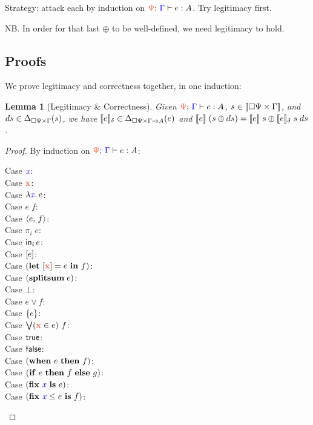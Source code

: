 \documentclass{article}
\theoremstyle{plain}
\newtheorem{lemma}{Lemma}
\theoremstyle{definition}
\begin{document}
Strategy: attack each by induction on $\J{\GP}{\GG}{e}{A}$. Try legitimacy
first.

NB. In order for that last $\oplus$ to be well-defined, we need legitimacy to
hold.


\subsection{Proofs}

We prove legitimacy and correctness together, in one induction:

\begin{lemma}[Legitimacy \& Correctness]
  Given $\J{\GP}{\GG}{e}{A}$, $s \in {\llbracket{\square{\Psi} \times\Gamma}\rrbracket}$, and $ds \in
  \Delta_{\square{\Psi} \times \Gamma}({s})$, we have $\llbracket{e}\rrbracket_\delta \in \Delta_{\square{\Psi} \times
    \Gamma \to A}({e})$ and $\llbracket{e}\rrbracket \;(s \oplus ds) = \llbracket{e}\rrbracket\;s \oplus
  \llbracket{e}\rrbracket_\delta\;s\;ds$.
\end{lemma}

\begin{proof}
  By induction on $\J{\GP}{\GG}{e}{A}$:

  \begin{description}
    \item[Case $\mathit{{\color{blue}{x}}}$:]
    \item[Case $\d x$:]
    \item[Case $\lambda{\ensuremath{\mathit{{\color{blue}{x}}}}}.\, e$:]
    \item[Case $e\;f$:]
    \item[Case $\langle{{e},\,{f}}\rangle$:]
    \item[Case $\pi_i\;e$:]
    \item[Case $\mathsf{in}_{i}\,{e}$:]
    \item[Case $[{e}]$:]
    \item[Case $(\letdisc{\d{x}}{e}{f})$:]
    \item[Case $(\mathbf{splitsum}\; {e})$:]
    \item[Case $\bot$:]
    \item[Case $e \vee f$:]
    \item[Case $\{{e}\}$:]
    \item[Case $\setelim{\d{x}}{e}{f}$:]
    \item[Case $\mathsf{true}$:]
    \item[Case $\mathsf{false}$:]
    \item[Case $(\mathbf{when}~{e}~\mathbf{then}~{f})$:]
    \item[Case $(\mathbf{if}~{e}~\mathbf{then}~{f}~\mathbf{else}~{g})$:]
    \item[Case $(\mathbf{fix}~{\mathit{{\color{blue}{x}}}}~\mathbf{is}~ e)$:]
    \item[Case $(\mathbf{fix}~{{\mathit{{\color{blue}{x}}}} \le {e}}~\mathbf{is}~{f})$:]
  \end{description}
\end{proof}
\end{document}
